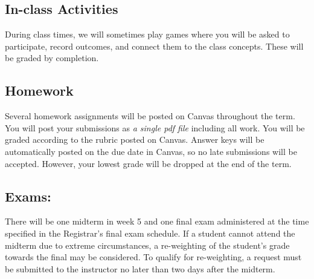 \hypertarget{grading_activity}{\subsection{In-class Activities}}

  During class times, we will sometimes play games where you will be asked to participate, record outcomes, and connect them to the class concepts. These will be graded by completion. 

  \hypertarget{grading_HW}{\subsection{Homework}}

  Several homework assignments will be posted on Canvas throughout the term. You will post your submissions as \textit{a single pdf file} including all work. You will be graded according to the rubric posted on Canvas. 
  Answer keys will be automatically posted on the due date in Canvas, so no late submissions will be accepted. However, your lowest grade will be dropped at the end of the term.

 
\hypertarget{grading_exam}{\subsection{Exams:}}
  There will be one midterm in week 5 and one final exam administered at the time specified in the Registrar’s final exam schedule. If a student cannot attend the midterm due to extreme circumstances, a re-weighting of the student’s grade towards the final may be considered. To qualify for re-weighting, a request must be submitted to the instructor no later than two days after the midterm.


